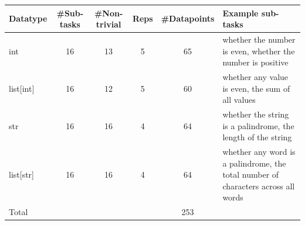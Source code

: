 \begin{tabular}{lccccp{5cm}}
\toprule
Datatype & \#Sub-tasks & \#Non-trivial & Reps & \#Datapoints & Example sub-tasks \\
\midrule
int & 16 & 13 & 5 & 65 & whether the number is even, whether the number is positive \\
list{[}int{]} & 16 & 12 & 5 & 60 & whether any value is even, the sum of all values \\
str & 16 & 16 & 4 & 64 & whether the string is a palindrome, the length of the string \\
list{[}str{]} & 16 & 16 & 4 & 64 & whether any word is a palindrome, the total number of characters across all words \\
\midrule
Total & & & & 253 &  \\
\bottomrule
\end{tabular}
